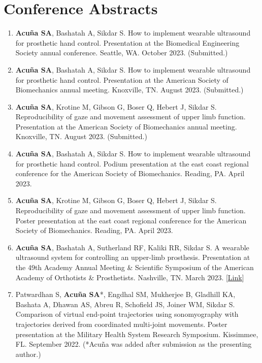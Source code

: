 \documentclass[letterpaper, 10pt]{article}
\begin{document}
\section{Conference Abstracts}
\begin{enumerate}
    \item \textbf{Acuña SA}, Bashatah A, Sikdar S. How to implement wearable ultrasound for prosthetic hand control. Presentation at the Biomedical Engineering Society annual conference. Seattle, WA. October 2023. (Submitted.)
    \item \textbf{Acuña SA}, Bashatah A, Sikdar S. How to implement wearable ultrasound for prosthetic hand control. Presentation at the American Society of Biomechanics annual meeting. Knoxville, TN. August 2023. (Submitted.)
     \item \textbf{Acuña SA}, Krotine M, Gibson G, Boser Q, Hebert J, Sikdar S. Reproducibility of gaze and movement assessment of upper limb function. Presentation at the American Society of Biomechanics annual meeting. Knoxville, TN. August 2023. (Submitted.)
    \item \textbf{Acuña SA}, Bashatah A, Sikdar S. How to implement wearable ultrasound for prosthetic hand control. Podium presentation at the east coast regional conference for the American Society of Biomechanics. Reading, PA. April 2023.
     \item \textbf{Acuña SA}, Krotine M, Gibson G, Boser Q, Hebert J, Sikdar S. Reproducibility of gaze and movement assessment of upper limb function. Poster presentation at the east coast regional conference for the American Society of Biomechanics. Reading, PA. April 2023.
    \item \textbf{Acuña SA}, Bashatah A, Sutherland RF, Kaliki RR, Sikdar S. A wearable ultrasound system for controlling an upper-limb prosthesis. Presentation at the 49th Academy Annual Meeting \& Scientiﬁc Symposium of the American Academy of Orthotists \& Prosthetists. Nashville, TN. March 2023. [\href{https://journals.lww.com/jpojournal/Citation/2023/04001/UPPER_LIMB_PROSTHESES.10.aspx}{Link}]
    \item Patwardhan S, \textbf{Acuña SA}*, Engdhal SM, Mukherjee B, Gladhill KA, Bashata A, Dhawan AS, Abreu R, Schofield JS, Joiner WM,  Sikdar S. Comparison of virtual end-point trajectories using sonomyography with trajectories derived from coordinated multi-joint movements. Poster presentation at the Military Health System Research Symposium. Kissimmee, FL. September 2022. (*Acuña was added after submission as the presenting author.)

\end{enumerate}
\end{document}
